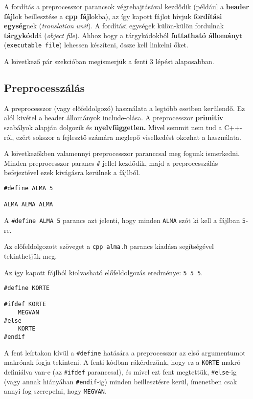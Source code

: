 \documentclass[a4paper,11.5pt]{article}
\begin{document}
	A fordítás a preprocesszor parancsok végrehajtásával kezdődik (például a \textbf{header fájl}ok beillesztése a \textbf{cpp fájl}okba), az így kapott fájlot hívjuk \textbf{fordítási egység}nek (\textit{translation unit}). A fordítási egységek külön-külön fordulnak \textbf{tárgykód}dá (\textit{object file}). Ahhoz hogy a tárgykódokból \textbf{futtatható állomány}t (\texttt{executable file}) lehessen készíteni, össze kell linkelni őket.
	\medskip
	
	A következő pár szekcióban megismerjük a fenti 3 lépést alaposabban.
	
	\subsection{Preprocesszálás}
	A preprocesszor (vagy előfeldolgozó) használata a legtöbb esetben kerülendő. Ez alól kivétel a header állományok include-olása. A preprocesszor \textbf{primitív} szabályok alapján dolgozik és \textbf{nyelvfüggetlen.} Mivel semmit nem tud a C++-ról, ezért sokszor a fejlesztő számára meglepő viselkedést okozhat a használata.
	
	A következőkben valamennyi preprocesszor paranccsal meg fogunk ismerkedni. Minden preprocesszor parancs \texttt{\#} jellel kezdődik, majd a preprocesszálás befejeztével ezek kivágásra kerülnek a fájlból.
	\bigskip
	
	\begin{lstlisting}
#define ALMA 5

ALMA ALMA ALMA
	\end{lstlisting}
	A \texttt{\#define ALMA 5}  parancs azt jelenti, hogy minden \texttt{ALMA} szót ki kell a fájlban \texttt{5}-re.
	
	Az előfeldolgozott szöveget a \texttt{cpp alma.h} parancs kiadása segítségével tekinthetjük meg.
	
	Az így kapott fájlból kiolvasható előfeldolgozás eredménye: \texttt{5 5 5}.
	\bigskip
	
	\begin{lstlisting}
#define KORTE

#ifdef KORTE
	MEGVAN
#else
	KORTE
#endif
	\end{lstlisting}
	A fent leírtakon kívül a \texttt{\#define} hatására a preprocesszor az első argumentumot makrónak fogja tekinteni. A fenti kódban rákérdezünk, hogy ez a \texttt{KORTE} makró definiálva van-e (az \texttt{\#ifdef} paranccsal), és mivel ezt fent megtettük, \texttt{\#else}-ig (vagy annak hiányában \texttt{\#endif}-ig) minden beillesztésre kerül, ímenetben csak annyi fog szerepelni, hogy \texttt{MEGVAN}.
	\bigskip
	
\end{document}
